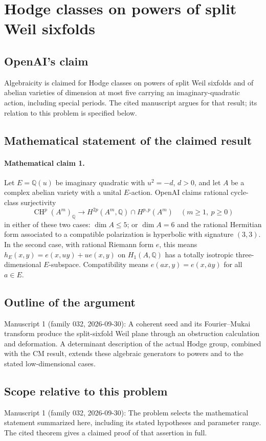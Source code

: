 \documentclass[11pt]{article}
\begin{document}
\section*{Hodge classes on powers of split Weil sixfolds}

\subsection{OpenAI's claim}
Algebraicity is claimed for Hodge classes on powers of split Weil sixfolds and of abelian varieties of dimension at most five carrying an imaginary-quadratic action, including special periods. The cited manuscript argues for that result; its relation to this problem is specified below.

\subsection{Mathematical statement of the claimed result}
\paragraph{Mathematical claim 1.} Let $E=\mathbb Q(u)$ be imaginary quadratic with $u^2=-d$, $d>0$, and let $A$ be a complex abelian variety with a unital $E$-action. OpenAI claims rational cycle-class surjectivity
\[
\operatorname{CH}^p(A^m)_{\mathbb Q}\longrightarrow H^{2p}(A^m,\mathbb Q)\cap H^{p,p}(A^m)
\quad(m\ge1,\ p\ge0)
\]
in either of these two cases: $\dim A\le5$; or $\dim A=6$ and the rational Hermitian form associated to a compatible polarization is hyperbolic with signature $(3,3)$. In the second case, with rational Riemann form $e$, this means $h_E(x,y)=e(x,uy)+u e(x,y)$ on $H_1(A,\mathbb Q)$ has a totally isotropic three-dimensional $E$-subspace. Compatibility means $e(ax,y)=e(x,\bar a y)$ for all $a\in E$.

\subsection{Outline of the argument}
Manuscript 1 (family 032, 2026-09-30): A coherent seed and its Fourier--Mukai transform produce the split-sixfold Weil plane through an obstruction calculation and deformation. A determinant description of the actual Hodge group, combined with the CM result, extends these algebraic generators to powers and to the stated low-dimensional cases.

\subsection{Scope relative to this problem}
Manuscript 1 (family 032, 2026-09-30): The problem selects the mathematical statement summarized here, including its stated hypotheses and parameter range. The cited theorem gives a claimed proof of that assertion in full.
\end{document}
